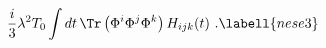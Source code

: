 \begin{equation}
{i\over3}\lambda^2T_0\int dt\,\Tr\left(\Phi^i\Phi^j\Phi^k\right)
H_{ijk}(t)\ .
\labell{nese3}
\end{equation}

